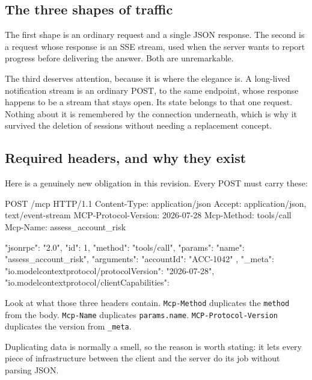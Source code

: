 \subsection{The three shapes of traffic}


The first shape is an ordinary request and a single JSON response. The second is
a request whose response is an SSE stream, used when the server wants to report
progress before delivering the answer. Both are unremarkable.

The third deserves attention, because it is where the elegance is. A long-lived notification stream is an ordinary POST, to the same endpoint,
whose response happens to be a stream that stays open. Its state belongs to
that one request. Nothing about it is remembered by the connection underneath,
which is why it survived the deletion of sessions without needing a replacement
concept.

\subsection{Required headers, and why they exist}
\label{sec:required-headers}

Here is a genuinely new obligation in this revision. Every POST must carry
these:

\begin{http}
POST /mcp HTTP/1.1
Content-Type: application/json
Accept: application/json, text/event-stream
MCP-Protocol-Version: 2026-07-28
Mcp-Method: tools/call
Mcp-Name: assess_account_risk

{
  "jsonrpc": "2.0",
  "id": 1,
  "method": "tools/call",
  "params": {
    "name": "assess_account_risk",
    "arguments": { "accountId": "ACC-1042" },
    "_meta": {
      "io.modelcontextprotocol/protocolVersion": "2026-07-28",
      "io.modelcontextprotocol/clientCapabilities": {}
    }
  }
}
\end{http}

Look at what those three headers contain. \texttt{Mcp-Method} duplicates the
\texttt{method} from the body. \texttt{Mcp-Name} duplicates
\texttt{params.name}. \texttt{MCP-Protocol-Version} duplicates the version from
\texttt{\_meta}.

Duplicating data is normally a smell, so the reason is worth stating: it lets
every piece of infrastructure between the client and the server do its job
without parsing JSON.

